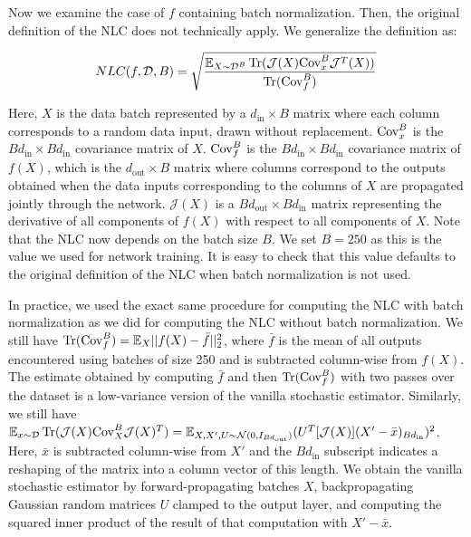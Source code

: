 \documentclass{article} %
\begin{document}
Now we examine the case of $f$ containing batch normalization. Then, the original definition of the NLC does not technically apply. We generalize the definition as:

\begin{equation*}
NLC(f,\mathcal{D},B) = \sqrt{\frac{\mathbb{E}_{X \sim \mathcal{D}^B}\operatorname{Tr}(\mathcal{J}(X)\mathrm{Cov}_x^B\mathcal{J}^T(X))}{\operatorname{Tr}(\mathrm{Cov}_f^B)}}
\end{equation*}

Here, $X$ is the data batch represented by a $d_\text{in} \times B$ matrix where each column corresponds to a random data input, drawn without replacement. $\mathrm{Cov}_x^B$ is the $Bd_\text{in} \times Bd_\text{in}$ covariance matrix of $X$. $\mathrm{Cov}_f^B$ is the $Bd_\text{in} \times Bd_\text{in}$ covariance matrix of $f(X)$, which is the $d_\text{out} \times B$ matrix where columns correspond to the outputs obtained when the data inputs corresponding to the columns of $X$ are propagated jointly through the network. $\mathcal{J}(X)$ is a $Bd_\text{out} \times Bd_\text{in}$ matrix representing the derivative of all components of $f(X)$ with respect to all components of $X$. Note that the NLC now depends on the batch size $B$. We set $B=250$ as this is the value we used for network training. It is easy to check that this value defaults to the original definition of the NLC when batch normalization is not used.

In practice, we used the exact same procedure for computing the NLC with batch normalization as we did for computing the NLC without batch normalization. We still have $\operatorname{Tr}(\mathrm{Cov}_f^B) = \mathbb{E}_X ||f(X)-\bar{f}||_2^2$, where $\bar{f}$ is the mean of all outputs encountered using batches of size 250 and is subtracted column-wise from $f(X)$. The estimate obtained by computing $\bar{f}$ and then $\operatorname{Tr}(\mathrm{Cov}_f^B)$ with two passes over the dataset is a low-variance version of the vanilla stochastic estimator. Similarly, we still have $\mathbb{E}_{x \sim \mathcal{D}}\operatorname{Tr}(\mathcal{J}(X)\mathrm{Cov}_X^B\mathcal{J}(X)^T) = \mathbb{E}_{X,X',U \sim \mathcal{N}(0,I_{Bd_\text{out}})} (U^T[\mathcal{J}(X)](X' - \bar{x})_{Bd_\text{in}})^2$. Here, $\bar{x}$ is subtracted column-wise from $X'$ and the $Bd_\text{in}$ subscript indicates a reshaping of the matrix into a column vector of this length. We obtain the vanilla stochastic estimator by forward-propagating batches $X$, backpropagating Gaussian random matrices $U$ clamped to the output layer, and computing the squared inner product of the result of that computation with $X' - \bar{x}$.
\end{document}
